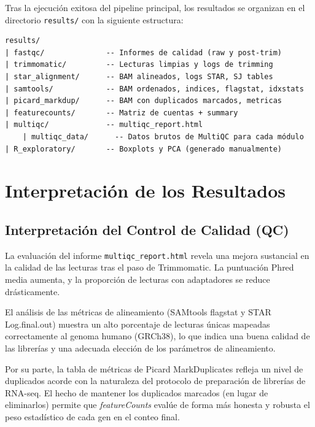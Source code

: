 \documentclass[11pt,a4paper]{article}
\begin{document}
Tras la ejecución exitosa del pipeline principal, los resultados se organizan en el directorio \texttt{results/} con la siguiente estructura:

\begin{verbatim}
results/
| fastqc/              -- Informes de calidad (raw y post-trim)
| trimmomatic/         -- Lecturas limpias y logs de trimming
| star_alignment/      -- BAM alineados, logs STAR, SJ tables
| samtools/            -- BAM ordenados, indices, flagstat, idxstats
| picard_markdup/      -- BAM con duplicados marcados, metricas
| featurecounts/       -- Matriz de cuentas + summary
| multiqc/             -- multiqc_report.html
    | multiqc_data/      -- Datos brutos de MultiQC para cada módulo
| R_exploratory/       -- Boxplots y PCA (generado manualmente)
\end{verbatim}

\section{Interpretación de los Resultados}
\label{sec:interpretacion}

\subsection{Interpretación del Control de Calidad (QC)}

La evaluación del informe \texttt{multiqc\_report.html} revela una mejora sustancial en la calidad de las lecturas tras el paso de Trimmomatic. La puntuación Phred media aumenta, y la proporción de lecturas con adaptadores se reduce drásticamente.

El análisis de las métricas de alineamiento (SAMtools flagstat y STAR Log.final.out) muestra un alto porcentaje de lecturas únicas mapeadas correctamente al genoma humano (GRCh38), lo que indica una buena calidad de las librerías y una adecuada elección de los parámetros de alineamiento.

Por su parte, la tabla de métricas de Picard MarkDuplicates refleja un nivel de duplicados acorde con la naturaleza del protocolo de preparación de librerías de RNA-seq. El hecho de mantener los duplicados marcados (en lugar de eliminarlos) permite que \textit{featureCounts} evalúe de forma más honesta y robusta el peso estadístico de cada gen en el conteo final.
\end{document}
